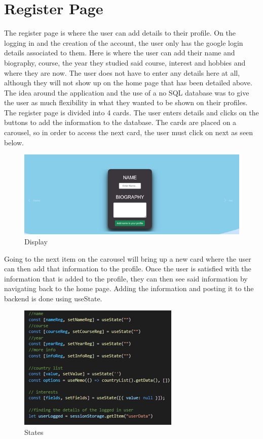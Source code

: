 \section{Register Page}
The register page is where the user can add details to their profile. On the logging in and the creation of the account, the user only has the google login details associated to them. Here is where the user can add their name and biography, course, the year they studied said course, interest and hobbies and where they are now. The user does not have to enter any details here at all, although they will not show up on the home page that has been detailed above. The idea around the application and the use of a no SQL database was to give the user as much flexibility in what they wanted to be shown on their profiles. The register page is divided into 4 cards. The user enters details and clicks on the buttons to add the information to the database. The cards are placed on a carousel, so in order to access the next card, the user must click on next as seen below. \\
\begin{figure}[H]
    \centering
    \includegraphics{img/Register1.png}
    \caption{Display} 
    \label{fig:my_label}
\end{figure}

Going to the next item on the carousel will bring up a new card where the user can then add that information to the profile. Once the user is satisfied with the information that is added to the profile, they can then see said information by navigating back to the home page. 
Adding the information and posting it to the backend is done using useState. 
\\
\begin{figure}[H]
    \centering
    \includegraphics{img/register2.png}
    \caption{States} 
    \label{fig:my_label}
\end{figure}

